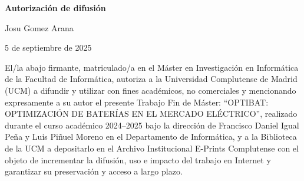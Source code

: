 \newpage

\thispagestyle{empty}

\begin{center}

  {\bf \Huge Autorización de difusión}

  \vspace{1cm}

  \large Josu Gomez Arana

  \vspace{0.5cm}

  5 de septiembre de 2025

  \vspace{0.5cm}

\end{center}

El/la abajo firmante, matriculado/a en el Máster en Investigación en Informática de la Facultad de Informática, autoriza a la Universidad Complutense de Madrid (UCM) a difundir y utilizar con fines académicos, no comerciales y mencionando expresamente a su autor el presente Trabajo Fin de Máster: “OPTIBAT\@: OPTIMIZACIÓN DE BATERÍAS EN EL MERCADO ELÉCTRICO”, realizado durante el curso académico 2024--2025 bajo la dirección de Francisco Daniel Igual Peña y Luis Piñuel Moreno en el Departamento de Informática, y a la Biblioteca de la UCM a depositarlo en el Archivo Institucional E-Prints Complutense con el objeto de incrementar la difusión, uso e impacto del trabajo en Internet y garantizar su preservación y acceso a largo plazo.

